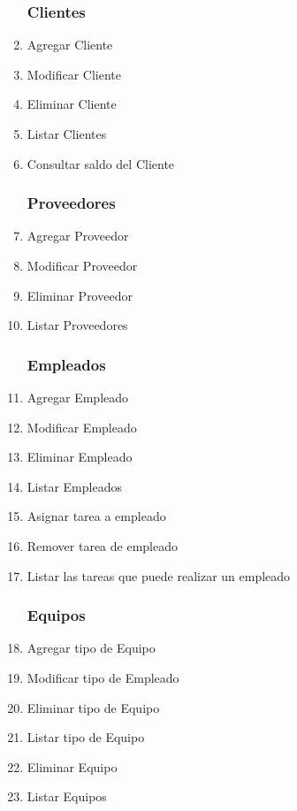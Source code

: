 \documentclass[12pt]{extarticle}
\begin{document}
\begin{spacing}{1.2}
\begin{multicols}{2}
\begin{enumerate}
        \subsubsection*{Clientes}
            \item Agregar Cliente
            \item Modificar Cliente
            \item Eliminar Cliente
            \item Listar Clientes
            \item Consultar saldo del Cliente
        \subsubsection*{Proveedores}
            \item Agregar Proveedor
            \item Modificar Proveedor
            \item Eliminar Proveedor
            \item Listar Proveedores	
        \subsubsection*{Empleados}
            \item Agregar Empleado
            \item Modificar Empleado
            \item Eliminar Empleado
            \item Listar Empleados	
            \item Asignar tarea a empleado
            \item Remover tarea de empleado
            \item Listar las tareas que puede realizar un empleado
        \subsubsection*{Equipos}
            \item Agregar tipo de Equipo
            \item Modificar tipo de Empleado
            \item Eliminar tipo de Equipo
            \item Listar tipo de Equipo
            \item Eliminar Equipo
            \item Listar Equipos

\end{enumerate}
\end{multicols}
\end{spacing}
\end{document}
